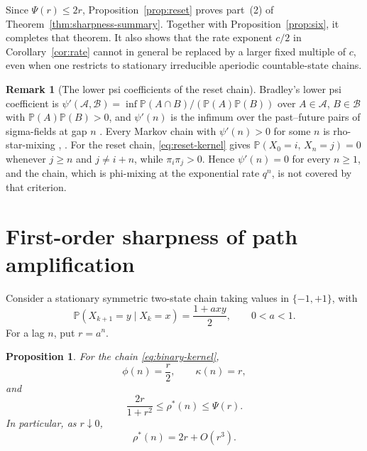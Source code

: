 \documentclass[11pt]{amsart}
\numberwithin{equation}{section}
\newtheorem{proposition}[theorem]{Proposition}
\theoremstyle{definition}
\newtheorem{remark}[theorem]{Remark}
\newcommand{\PP}{\mathbb P}
\newcommand{\rhostar}{\rho^{*}}
\begin{document}
Since $\Psi(r)\le2r$, Proposition~\ref{prop:reset} proves part~(2) of Theorem~\ref{thm:sharpness-summary}. Together with Proposition~\ref{prop:six}, it completes that theorem. It also shows that the rate exponent $c/2$ in Corollary~\ref{cor:rate} cannot in general be replaced by a larger fixed multiple of $c$, even when one restricts to stationary irreducible aperiodic countable-state chains.

\begin{remark}[The lower psi coefficients of the reset chain]\label{rem:lower-psi}
Bradley's lower psi coefficient is $\psi'(\mathcal A,\mathcal B)=\inf\PP(A\cap B)/(\PP(A)\PP(B))$ over $A\in\mathcal A$, $B\in\mathcal B$ with $\PP(A)\PP(B)>0$, and $\psi'(n)$ is the infimum over the past--future pairs of sigma-fields at gap $n$ \cite[(1.7)]{Bradley2005}. Every Markov chain with $\psi'(n)>0$ for some $n$ is rho-star-mixing \cite[Theorem~1.2]{Bradley1997}, \cite[Theorem~3.3(7)]{Bradley2005}. For the reset chain, \eqref{eq:reset-kernel} gives $\PP(X_0=i,\,X_n=j)=0$ whenever $j\ge n$ and $j\ne i+n$, while $\pi_i\pi_j>0$. Hence $\psi'(n)=0$ for every $n\ge1$, and the chain, which is phi-mixing at the exponential rate $q^n$, is not covered by that criterion.
\end{remark}

\section{First-order sharpness of path amplification}\label{sec:binary}

Consider a stationary symmetric two-state chain taking values in $\{-1,+1\}$, with
\begin{equation}\label{eq:binary-kernel}
\PP(X_{k+1}=y\mid X_k=x)=\frac{1+axy}{2},\qquad 0<a<1.
\end{equation}
For a lag $n$, put $r=a^n$.

\begin{proposition}\label{prop:binary}
For the chain \eqref{eq:binary-kernel},
\begin{equation}\label{eq:binary-basic}
\phi(n)=\frac r2,\qquad \kappa(n)=r,
\end{equation}
and
\begin{equation}\label{eq:binary-envelope}
\frac{2r}{1+r^2}\le\rhostar(n)\le\Psi(r).
\end{equation}
In particular, as $r\downarrow0$,
\begin{equation}\label{eq:binary-first-order}
\rhostar(n)=2r+O(r^3).
\end{equation}
\end{proposition}
\end{document}

